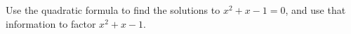 \documentclass{book}
\begin{document}
\setcounter{cpjt}{267}
\addtocounter{cpjt}{-1}
\begin{activity}\label{factorFibonacci}
\hypertarget{p-1365}{}%
Use the quadratic formula to find the solutions to \(x^2+x-1=0\), and use that information to factor \(x^2+x-1\).%
\par\smallskip%
\noindent\end{activity}

\clearpage
\end{document}
